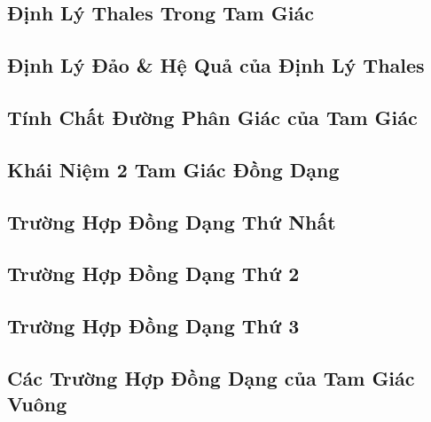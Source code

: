 \documentclass{article}
\numberwithin{equation}{section}
\begin{document}
\subsection{Định Lý Thales Trong Tam Giác}


\subsection{Định Lý Đảo \& Hệ Quả của Định Lý Thales}


\subsection{Tính Chất Đường Phân Giác của Tam Giác}


\subsection{Khái Niệm 2 Tam Giác Đồng Dạng}


\subsection{Trường Hợp Đồng Dạng Thứ Nhất}


\subsection{Trường Hợp Đồng Dạng Thứ 2}


\subsection{Trường Hợp Đồng Dạng Thứ 3}


\subsection{Các Trường Hợp Đồng Dạng của Tam Giác Vuông}
\end{document}

